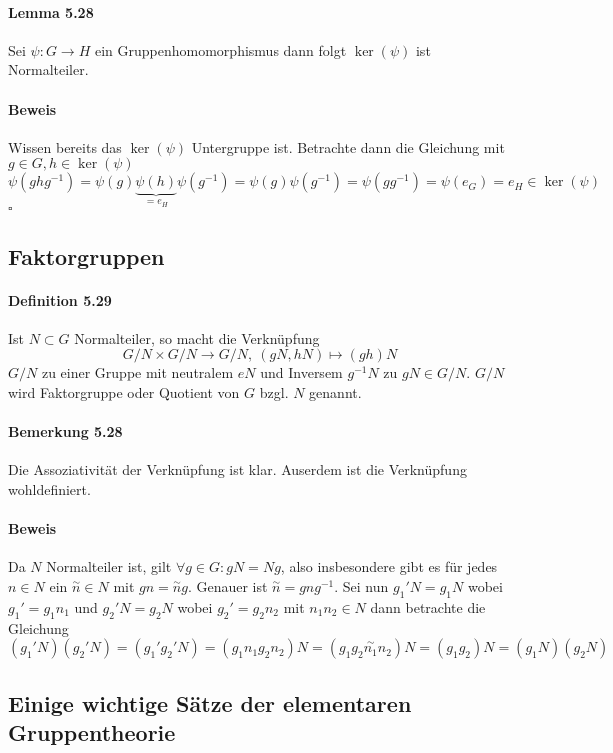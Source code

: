 \documentclass{scrartcl}
\newcommand{\s}[1]{\overset{\sim}{#1}} %
\newcommand{\ub}[2]{\underbrace{#1}_{#2}} %
\begin{document}
\paragraph{Lemma 5.28} Sei $\psi: G \to H$ ein Gruppenhomomorphismus dann folgt
$\ker(\psi)$ ist Normalteiler.
\paragraph{Beweis}
Wissen bereits das $\ker(\psi)$ Untergruppe ist. Betrachte dann die Gleichung
mit $g \in G, h \in \ker(\psi)$
\[
  \psi(ghg^{-1})=\psi(g)\ub{\psi(h)}{=e_H}\psi(g^{-1})
  =\psi(g)\psi(g^{-1})=\psi(gg^{-1})=\psi(e_G)=e_H \in \ker(\psi)
\]
\hfill $\square$

\subsection{Faktorgruppen}
\label{subsec:faktorgruppen}

\paragraph{Definition 5.29} Ist $N \subset G$ Normalteiler, so macht die
Verknüpfung
\[
  G/N \times G/N \to G/N,~(gN, hN) \mapsto (gh)N
\]
$G/N$ zu einer Gruppe mit neutralem $eN$ und Inversem $g^{-1}N$ zu $gN \in G/N$.
$G/N$ wird Faktorgruppe oder Quotient von $G$ bzgl. $N$ genannt.
\paragraph{Bemerkung 5.28} Die Assoziativität der Verknüpfung ist klar. Auserdem
ist die Verknüpfung wohldefiniert.
\paragraph{Beweis}
Da $N$ Normalteiler ist, gilt $\forall g \in G: gN=Ng$, also insbesondere gibt
es für jedes $n \in N$ ein $\s{n} \in N$ mit $gn=\s{n}g$. Genauer ist $\s{n}=gng^{-1}$. 
Sei nun $g_1'N=g_1N$ wobei $g_1'=g_1n_1$ und $g_2'N=g_2N$ wobei $g_2'=g_2n_2$
mit $n_1n_2 \in N$ dann betrachte die Gleichung
\[
  (g_1'N)(g_2'N) = (g_1'g_2'N) = (g_1n_1g_2n_2)N = (g_1g_2\s{n_1}n_2)N
  =(g_1g_2)N = (g_1N)(g_2N)
\]

\subsection{Einige wichtige Sätze der elementaren Gruppentheorie}
\label{subsec:einigewichtigesaetzederelementaregruppentheorie}
\end{document}
